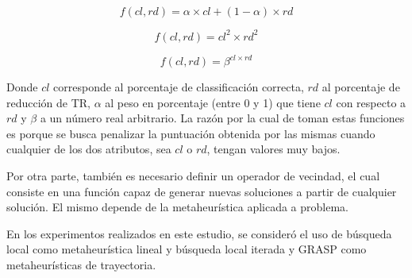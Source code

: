 \documentclass{ci5652}
\begin{document}
\begin{equation}\label{eq:weight}
f(cl,rd) = \alpha\times cl + (1 - \alpha)\times rd
\end{equation}

\begin{equation}\label{eq:sqr}
f(cl,rd) = cl^{2}\times rd^{2}
\end{equation}

\begin{equation}\label{eq:exp}
f(cl,rd) = \beta^{cl\times rd}
\end{equation}

Donde $cl$ corresponde al porcentaje de classificación correcta, $rd$ al porcentaje de reducción de TR, $\alpha$ al peso en porcentaje (entre 0 y 1) que tiene $cl$ con respecto a $rd$ y $\beta$ a un número real arbitrario. La razón por la cual de toman estas funciones es porque se busca penalizar la puntuación obtenida por las mismas cuando cualquier de los dos atributos, sea $cl$ o $rd$, tengan valores muy bajos.

Por otra parte, también es necesario definir un operador de vecindad, el cual consiste en una función capaz de generar nuevas soluciones a partir de cualquier solución. El mismo depende de la metaheurística aplicada a problema.

En los experimentos realizados en este estudio, se consideró el uso de búsqueda local como metaheurística lineal y búsqueda local iterada y GRASP como metaheurísticas de trayectoria.
\end{document}
